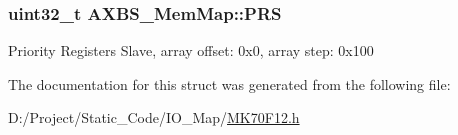 \subsubsection[{P\+R\+S}]{\setlength{\rightskip}{0pt plus 5cm}uint32\+\_\+t A\+X\+B\+S\+\_\+\+Mem\+Map\+::\+P\+R\+S}\label{struct_a_x_b_s___mem_map_a840c4c5791c39bad3cfa7140aaab0a1f}
Priority Registers Slave, array offset\+: 0x0, array step\+: 0x100 

The documentation for this struct was generated from the following file\+:\begin{DoxyCompactItemize}
\item 
D\+:/\+Project/\+Static\+\_\+\+Code/\+I\+O\+\_\+\+Map/\hyperlink{_m_k70_f12_8h}{M\+K70\+F12.\+h}\end{DoxyCompactItemize}

